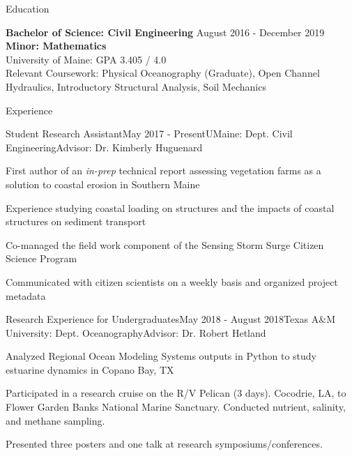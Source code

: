 \documentclass{resume} %
\begin{document}


\begin{rSection}{Education}

{\bf Bachelor of Science: Civil Engineering} \hfill {August 2016 - December 2019}
\\ 
{\bf Minor: Mathematics}
\\
University of Maine: GPA 3.405 / 4.0 
\\
Relevant Coursework: Physical Oceanography (Graduate), Open Channel Hydraulics, Introductory Structural Analysis, Soil Mechanics

\end{rSection}

\begin{rSection}{Experience}
\begin{rSubsection}{Student Research Assistant}{May 2017 - Present}{UMaine: Dept. Civil Engineering}{Advisor: Dr. Kimberly Huguenard} 
\item First author of an \textit{in-prep} technical report assessing vegetation farms as a solution to coastal erosion in Southern Maine
\item Experience studying coastal loading on structures and the impacts of coastal structures on sediment transport
\item Co-managed the field work component of the Sensing Storm Surge Citizen Science Program
\item Communicated with citizen scientists on a weekly basis and organized project metadata
\end{rSubsection}
\begin{rSubsection}{Research Experience for Undergraduates}{May 2018 - August 2018}{Texas A$\&$M University: Dept. Oceanography}{Advisor: Dr. Robert Hetland} 
\item Analyzed Regional Ocean Modeling Systems outputs in Python to study estuarine dynamics in Copano Bay, TX
\item Participated in a research cruise on the R/V Pelican (3 days). Cocodrie, LA, to Flower Garden Banks National Marine Sanctuary. Conducted nutrient, salinity, and methane sampling.
\item Presented three posters and one talk at research symposiums/conferences.
\end{rSubsection} 

\end{rSection} 
\end{document}
